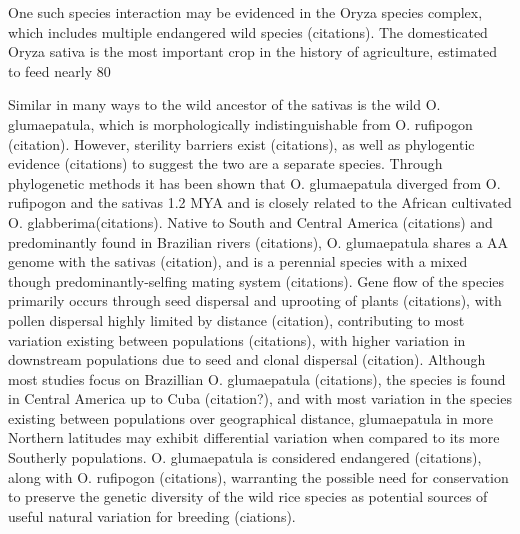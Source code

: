 \documentclass[11pt]{article} %
\begin{document}
One such species interaction may be evidenced in the Oryza species complex, which includes multiple endangered wild species (citations).  The domesticated Oryza sativa is the most important crop in the history of agriculture, estimated to feed nearly 80%

Similar in many ways to the wild ancestor of the sativas is the wild O. glumaepatula, which is morphologically indistinguishable from O. rufipogon (citation). However, sterility barriers exist (citations), as well as phylogentic evidence (citations) to suggest the two are a separate species.  Through phylogenetic methods it has been shown that O. glumaepatula diverged from O. rufipogon and the sativas 1.2 MYA and is closely related to the African cultivated O. glabberima(citations). Native to South and Central America (citations) and predominantly found in Brazilian rivers (citations),  O. glumaepatula shares a AA genome with the sativas (citation), and is a perennial species with a mixed though predominantly-selfing mating system (citations).  Gene flow of the species primarily occurs through seed dispersal and uprooting of plants (citations), with pollen dispersal highly limited by distance (citation), contributing to most variation existing between populations (citations), with higher variation in downstream populations due to seed and clonal dispersal (citation). Although most studies focus on Brazillian O. glumaepatula (citations), the species is found in Central America up to Cuba (citation?), and with most variation in the species existing between populations over geographical distance, glumaepatula in more Northern latitudes may exhibit differential variation when compared to its more Southerly populations. O. glumaepatula is considered endangered (citations), along with O. rufipogon (citations), warranting the possible need for conservation to preserve the genetic diversity of the wild rice species as potential sources of useful natural variation for breeding (ciations).  
\end{document}
